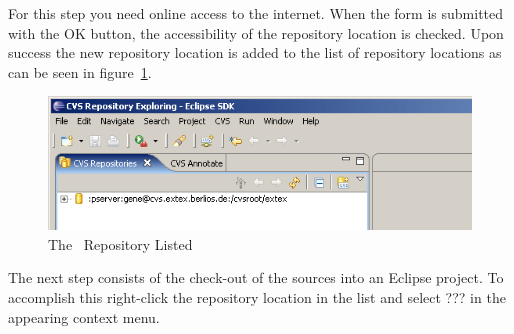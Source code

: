 \documentclass{extex-doc}
\newcommand\menu{\textsf}
\begin{document}
For this step you need online access to the internet. When the form is
submitted with the OK button, the accessibility of the repository
location is checked. Upon success the new repository location is
added to the list of repository locations as can be seen in
figure~\ref{fig:eclipse-cvs}.
\begin{figure}[ht]
  \centering  \includegraphics[scale=.4]{image/eclipse-cvs}
  \caption{The \ExTeX\ Repository Listed}\label{fig:eclipse-cvs}
\end{figure}

The next step consists of the check-out of the sources into an Eclipse
project. To accomplish this right-click the repository location in the
list and select \menu{???} in the appearing context menu.

\INCOMPLETE
\end{document}

